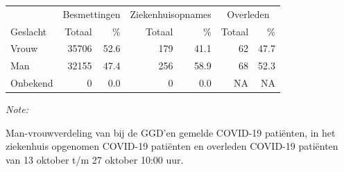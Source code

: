 \documentclass[
  english,
  man,floatsintext]{apa6}
\begin{document}
\begin{table}
\centering\begingroup\fontsize{11}{13}\selectfont

\begin{threeparttable}
\begin{tabular}{lrrrrrr}
\toprule
\multicolumn{1}{c}{ } & \multicolumn{2}{c}{Besmettingen} & \multicolumn{2}{c}{Ziekenhuisopnames} & \multicolumn{2}{c}{Overleden} \\
\cmidrule(l{3pt}r{3pt}){2-3} \cmidrule(l{3pt}r{3pt}){4-5} \cmidrule(l{3pt}r{3pt}){6-7}
Geslacht & Totaal & \% & Totaal & \% & Totaal & \%\\
\midrule
Vrouw & 35706 & 52.6 & 179 & 41.1 & 62 & 47.7\\
Man & 32155 & 47.4 & 256 & 58.9 & 68 & 52.3\\
Onbekend & 0 & 0.0 & 0 & 0.0 & NA & NA\\
\bottomrule
\end{tabular}
\begin{tablenotes}
\item \textit{Note: } 
\item Man-vrouwverdeling van bij de GGD’en gemelde COVID-19 patiënten, in het ziekenhuis opgenomen COVID-19 patiënten en overleden COVID-19 patiënten van 13 oktober t/m 27 oktober 10:00 uur.
\end{tablenotes}
\end{threeparttable}
\endgroup{}
\end{table}
\newpage
\end{document}
